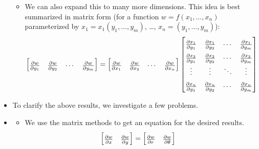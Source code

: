 \documentclass[../main.tex]{subfiles}
\begin{document}
\begin{itemize}
\begin{itemize}
        \item We can also expand this to many more dimensions. This idea is best summarized in matrix form (for a function $w=f(x_1,\dots,x_n)$ parameterized by $x_1=x_1(y_1,\dots,y_m)$, \dots, $x_n=(y_1,\dots,y_m)$):
        \begin{equation*}
            \renewcommand{\arraystretch}{1.6}
            \begin{bmatrix}
                \pdv{w}{y_1} & \pdv{w}{y_2} & \cdots & \pdv{w}{y_m}\\
            \end{bmatrix}
            =
            \begin{bmatrix}
                \pdv{w}{x_1} & \pdv{w}{x_2} & \cdots & \pdv{w}{x_n}\\
            \end{bmatrix}
            \begin{bmatrix}
                \pdv{x_1}{y_1} & \pdv{x_1}{y_2} & \cdots & \pdv{x_1}{y_m}\\
                \pdv{x_2}{y_1} & \pdv{x_2}{y_2} & \cdots & \pdv{x_2}{y_m}\\
                \vdots         & \vdots         & \ddots & \vdots        \\
                \pdv{x_n}{y_1} & \pdv{x_n}{y_2} & \cdots & \pdv{x_n}{y_m}\\
            \end{bmatrix}
        \end{equation*}
    \end{itemize}
    \item To clarify the above results, we investigate a few problems.
    \item {}
    \begin{itemize}
        \item We use the matrix methods to get an equation for the desired results.
        \renewcommand{\arraystretch}{1.6}
        \begin{align*}
            \begin{bmatrix}
                \pdv{w}{x} & \pdv{w}{y}\\
            \end{bmatrix}
            &=
            \begin{bmatrix}
                \pdv{w}{r} & \pdv{w}{\theta}\\
            \end{bmatrix}

\end{align*}
\end{itemize}
\end{itemize}
\end{document}
